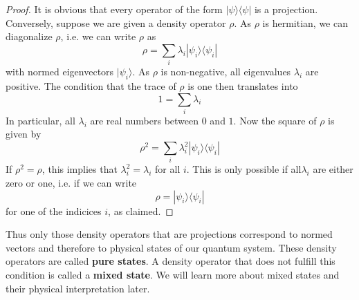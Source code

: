 \documentclass[a4paper, draft]{article}
\theoremstyle{own}
\theoremstyle{remark}
\begin{document}
\begin{proof}
It is obvious that every operator of the form $|\psi \rangle \langle \psi |$ is a projection. Conversely, suppose we are given a density operator $\rho$. As $\rho$ is hermitian, we can diagonalize $\rho$, i.e. we can write $\rho$ as
$$
\rho = \sum_i \lambda_i |\psi_i \rangle \langle \psi_i |
$$
with normed eigenvectors $|\psi_i \rangle$. As $\rho$ is non-negative, all eigenvalues $\lambda_i$ are positive. The condition that the trace of $\rho$ is one then translates into
$$
1 = \sum_i \lambda_i
$$
In particular, all $\lambda_i$ are real numbers between $0$ and $1$. Now the square of $\rho$ is given by
$$
\rho^2 = \sum_i \lambda_i^2 |\psi_i \rangle \langle \psi_i |
$$
If $\rho^2 = \rho$, this implies that $\lambda_i^2 = \lambda_i$ for all $i$. This is only possible if all$ \lambda_i$ are either zero or one, i.e. if we can write
$$
\rho = |\psi_i \rangle \langle \psi_i |
$$
for one of the indicices $i$, as claimed.
\end{proof}

Thus only those density operators that are projections correspond to normed vectors and therefore to physical states of our quantum system. These density operators are called {\bf pure states}. A density operator that does not fulfill this condition is called a {\bf mixed state}. We will learn more about mixed states and their physical interpretation later.
\end{document}
